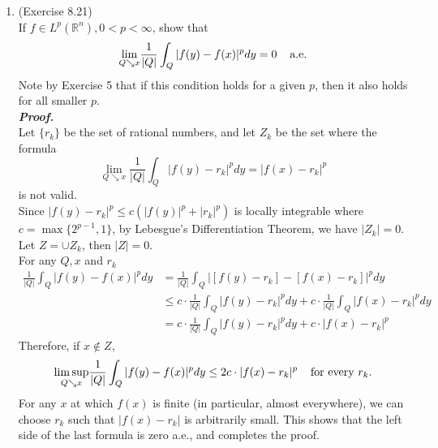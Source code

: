 \documentclass[a4paper,11pt]{article}
\begin{document}
\begin{enumerate}
	\item (Exercise 8.21)\\
		If $f \in L^p (\mathbb{R}^n), 0 < p < \infty$, show that
			$$\underset{Q \searrow x}{\lim} \frac{1}{|Q|} \int_Q |f(y) - f(x)|^p dy = 0 \hspace{0.4cm} \text{a.e.}$$
		Note by Exercise 5 that if this condition holds for a given $p$, then it also holds for all smaller $p$.\\
	\newline
 	\textit{\textbf {Proof.}}\\
 		Let $\{r_k\}$ be the set of rational numbers, and let $Z_k$ be the set where the formula
 			$$\underset{Q \searrow x}{\lim} \frac{1}{|Q|} \int_Q |f(y) - r_k|^p dy = |f(x) - r_k|^p$$
 		is not valid.\\
 		Since $|f(y) - r_k|^p \leq c (|f(y)|^p + |r_k|^p)$ is locally integrable where $c = \max \{ 2^{p-1}, 1 \}$, by Lebesgue’s Differentiation Theorem, we have $|Z_k| = 0$.\\
 		Let $Z = \cup Z_k$, then $|Z| = 0$.\\
 		For any $Q, x$ and $r_k$
 			$$\begin{aligned}
 			\frac{1}{|Q|}\int_Q |f(y) - f(x)|^p dy
 			&= \frac{1}{|Q|}\int_Q |[f(y) - r_k] - [f(x) - r_k]|^p dy\\
 			&\leq c \cdot \frac{1}{|Q|}\int_Q |f(y) - r_k|^p dy + c \cdot \frac{1}{|Q|}\int_Q |f(x) - r_k|^p dy\\
 			&= c \cdot \frac{1}{|Q|}\int_Q |f(y) - r_k|^p dy + c \cdot |f(x) - r_k|^p
 			\end{aligned}$$
 		Therefore, if $x \notin Z$,
 			$$\underset{Q \searrow x}{\lim \sup}\frac{1}{|Q|}\int_Q |f(y) - f(x)|^p dy
 			\leq 2c \cdot |f(x) - r_k|^p
 			\hspace{0.4cm} \text{for every $r_k$.}$$
 		 For any $x$ at which $f(x)$ is finite (in particular, almost everywhere), we can choose $r_k$ such that $|f(x) - r_k|$ is arbitrarily small. This shows that the left side of the last formula is zero a.e., and completes the proof.



\end{enumerate}
\end{document}
